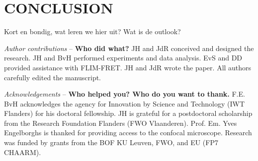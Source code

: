 \documentclass{uhphysreport}
\begin{document}
\section{CONCLUSION}
Kort en bondig, wat leren we hier uit? 
Wat is de outlook?


\textit{Author contributions} -- \textbf{Who did what?} 
JH and JdR conceived and designed the research. 
JH and BvH performed experiments and data analysis. 
EvS and DD provided assistance with FLIM-FRET. JH and JdR wrote the paper. 
All authors carefully edited the manuscript.

\textit{Acknowledgements} -- \textbf{Who helped you? Who do you want to thank.} 
F.E. BvH acknowledges the agency for Innovation by Science and Technology (IWT Flanders) for his doctoral fellowship. 
JH is grateful for a postdoctoral scholarship from the Research Foundation Flanders (FWO Vlaanderen). 
Prof. Em. Yves Engelborghs is thanked for providing access to the confocal microscope. 
Research was funded by grants from the BOF KU Leuven, FWO, and EU (FP7 CHAARM).

\clearpage

\clearpage

\vspace{0.5cm}
\printbibliography[title={REFERENCES}]
\newpage
\end{document}
